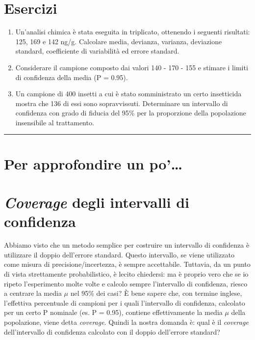 \documentclass[a4paper,12pt,oneside]{book}
\providecommand{\tightlist}{%
  \setlength{\itemsep}{0pt}\setlength{\parskip}{0pt}}
\begin{document}
\hypertarget{esercizi}{%
\section{Esercizi}\label{esercizi}}

\begin{enumerate}
\def\labelenumi{\arabic{enumi}.}
\tightlist
\item
  Un'analisi chimica è stata eseguita in triplicato, ottenendo i seguenti risultati: 125, 169 e 142 ng/g. Calcolare media, devianza, varianza, deviazione standard, coefficiente di variabilità ed errore standard.
\item
  Considerare il campione composto dai valori 140 - 170 - 155 e stimare i limiti di confidenza della media (P = 0.95).
\item
  Un campione di 400 insetti a cui è stato somministrato un certo insetticida mostra che 136 di essi sono sopravvissuti. Determinare un intervallo di confidenza con grado di fiducia del 95\% per la proporzione della popolazione insensibile al trattamento.
\end{enumerate}

\begin{center}\rule{0.5\linewidth}{\linethickness}\end{center}

\hypertarget{per-approfondire-un-po-3}{%
\section{Per approfondire un po'\ldots{}}\label{per-approfondire-un-po-3}}

\hypertarget{coverage-degli-intervalli-di-confidenza}{%
\section{\texorpdfstring{\emph{Coverage} degli intervalli di confidenza}{Coverage degli intervalli di confidenza}}\label{coverage-degli-intervalli-di-confidenza}}

Abbiamo visto che un metodo semplice per costruire un intervallo di confidenza è utilizzare il doppio dell'errore standard. Questo intervallo, se viene utilizzato come misura di precisione/incertezza, è sempre accettabile. Tuttavia, da un punto di vista strettamente probabilistico, è lecito chiedersi: ma è proprio vero che se io ripeto l'esperimento molte volte e calcolo sempre l'intervallo di confidenza, riesco a centrare la media \(\mu\) nel 95\% dei casi? È bene sapere che, con termine inglese, l'effettiva percentuale di campioni per i quali l'intervallo di confidenza, calcolato per un certo P nominale (es. P = 0.95), contiene effettivamente la media \(\mu\) della popolazione, viene detta \emph{coverage}. Quindi la nostra domanda è: qual è il \emph{coverage} dell'intervallo di confidenza calcolato con il doppio dell'errore standard?
\end{document}
